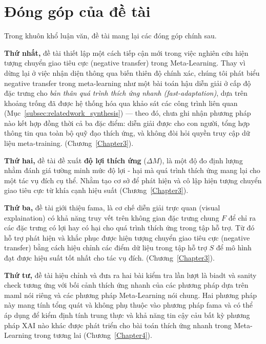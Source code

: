 \section{Đóng góp của đề tài}
\label{sec:contributions}

Trong khuôn khổ luận văn, đề tài mang lại các đóng góp chính sau.

\textbf{Thứ nhất,} đề tài thiết lập một cách tiếp cận mới trong việc nghiên cứu hiện tượng chuyển giao tiêu cực (negative transfer) trong Meta-Learning. Thay vì dừng lại ở việc nhận diện thông qua biến thiên độ chính xác, chúng tôi phát biểu negative transfer trong meta-learning như một bài toán hậu diễn giải ở cấp độ đặc trưng cho \textit{bản thân quá trình thích ứng nhanh (fast-adaptation)}, dựa trên khoảng trống đã được hệ thống hóa qua khảo sát các công trình liên quan (Mục~\ref{subsec:relatedwork_synthesis}) — theo đó, chưa ghi nhận phương pháp nào kết hợp đồng thời cả ba đặc điểm: diễn giải được cho con người, tổng hợp thông tin qua toàn bộ quỹ đạo thích ứng, và không đòi hỏi quyền truy cập dữ liệu meta-training. (Chương~\ref{Chapter3}).

\textbf{Thứ hai,} đề tài đề xuất \textbf{độ lợi thích ứng} ($\Delta M$), là một độ đo định lượng nhằm đánh giá tường minh mức độ lợi - hại mà quá trình thích ứng mang lại cho một tác vụ đích cụ thể. Nhằm tạo cơ sở để phát hiện và cô lập hiện tượng chuyển giao tiêu cực từ khía cạnh hiệu suất (Chương~\ref{Chapter3}).

\textbf{Thứ ba,} đề tài giới thiệu \acrfull{fama}, là cơ chế diễn giải trực quan (visual explaination) có khả năng truy vết trên không gian đặc trưng chung $F$ để chỉ ra các đặc trưng có lợi hay có hại cho quá trình thích ứng trong tập hỗ trợ. Từ đó hỗ trợ phát hiện và khắc phục được hiện tượng chuyển giao tiêu cực (negative transfer) bằng cách hiệu chỉnh các điểm dữ liệu trong tập hỗ trợ $S$ để mô hình đạt được hiệu suất tốt nhất cho tác vụ đích. (Chương~\ref{Chapter3}).

\textbf{Thứ tư,} đề tài hiệu chỉnh và đưa ra hai bài kiểm tra lần lượt là \acrshort{biadt} và sanity check tương ứng với bối cảnh thích ứng nhanh của các phương pháp dựa trên \acrshort{maml} nói riêng và các phương pháp Meta-Learning nói chung. Hai phương pháp này mang tính tổng quát và không phụ thuộc vào phương pháp \acrshort{fama} và có thể áp dụng để kiểm định tính trung thực và khả năng tin cậy cảu bất kỳ phương pháp XAI nào khác được phát triển cho bài toán thích ứng nhanh trong Meta-Learning trong tương lai (Chương~\ref{Chapter4}).


